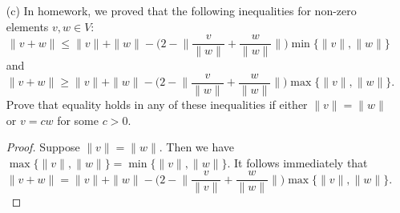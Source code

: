 \documentclass[a4paper]{article}
\begin{document}
\begin{enumerate}
\begin{proof}
\begin{align*}
                                                                                                               &+ \frac{ \|w\|^{2} }{ 2  }  - \frac{ \|w\| }{ 2 \|v \| }  \Re \langle v , w \rangle \\
                                                                                                               &\leq \frac{ 1 }{ 2 }  \big[ \|v\|^{2} - 2 \Re \langle v , w \rangle + \|w\|^{2} \big] - \Big[ \frac{ \|v\| }{ \|w\| } \Re \langle v , w \rangle + \frac{ \|w\| }{ \|v\| }  \Re \langle v , w \rangle\Big] \\
                                                                                                               &\leq  \frac{ 1 }{ 2 } \big[ \|v\|^{2} - 2 \Re \langle v , w \rangle + \|w\|^{2} \big] \\
                                                                                                               &\leq \|v\|^{2} - 2 \Re \langle v , w \rangle + \|w\|^{2} \\
                                                                                                               &= \|v-w\|^{2}.
        \end{align*}
        Hence, (*) is obtained by rearranging terms and taking the square root of both sides of the above inequality.
        \end{proof}
    \item[(c)] In homework, we proved that the following inequalities for non-zero elements \( v,w \in V  \):
        \[  \|v + w\| \leq \|v \| + \|w \| - \Big(  2 - \Big\| \frac{ v  }{  \|w \| }  + \frac{  w  }{ \|w\| } \Big\| \Big) \min \{  \|v\| , \|w\| \}  \]
        and
        \[  \|v + w\| \geq \|v \| + \|w \| - \Big(  2 - \Big\| \frac{ v  }{  \|w \| }  + \frac{  w  }{ \|w\| } \Big\| \Big) \max \{  \|v\| , \|w\| \}.  \]
        Prove that equality holds in any of these inequalities if either \( \|v\| = \|w\| \) or \( v = cw  \) for some \( c > 0  \).
        \begin{proof}
        Suppose \( \|v \| = \|w \| \). Then we have \( \max \{  \|v\|, \|w\| \}  = \min \{ \|v\|, \|w\| \}  \). It follows immediately that 
        \[  \|v + w\| = \|v\| + \|w\| - \Big(  2 - \Big\| \frac{ v }{ \|v\| }  + \frac{ w }{ \|w\| }  \Big\| \Big) \max \{  \|v\|, \|w\| \}. \]


\end{proof}
\end{enumerate}
\end{document}
